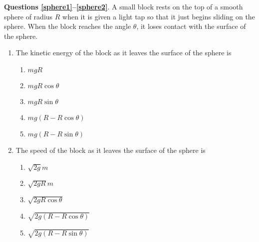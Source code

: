 \documentclass{../../../oss-apphys}
\begin{document}
\begin{multicols}{2}
  \textbf{Questions \ref{sphere1}--\ref{sphere2}}. A small block rests on the
  top of a smooth sphere of radius $R$ when it is given a light tap so that it
  just begins sliding on the sphere. When the block reaches the angle $\theta$,
  it loses contact with the surface of the sphere.
  \begin{center}
  \end{center}  
  \begin{enumerate}[resume,leftmargin=18pt]
  \item The kinetic energy of the block as it leaves the surface of the sphere
    is
    \label{sphere1}
    \begin{enumerate}[nosep,leftmargin=18pt,label=(\Alph*)]
    \item $mgR$
    \item $mgR\cos\theta$
    \item $mgR\sin\theta$
    \item $mg(R-R\cos\theta)$
    \item $mg(R-R\sin\theta)$
    \end{enumerate}

  \item The speed of the block as it leaves the surface of the sphere is
    \label{sphere2}
    \begin{enumerate}[nosep,leftmargin=18pt,label=(\Alph*)]
    \item $\displaystyle\sqrt{2g}{m}$
    \item $\displaystyle\sqrt{2gR}{m}$
    \item $\displaystyle\sqrt{2gR\cos\theta}$
    \item $\displaystyle\sqrt{2g(R-R\cos\theta)}$
    \item $\displaystyle\sqrt{2g(R-R\sin\theta)}$
    \end{enumerate}
    \columnbreak
    

\end{enumerate}
\end{multicols}
\end{document}

